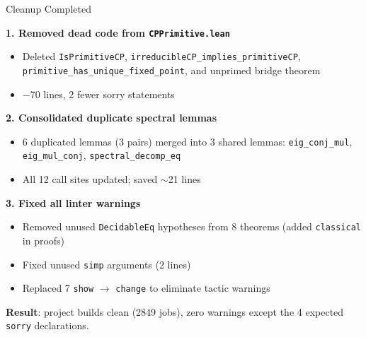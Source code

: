 \documentclass[aspectratio=169,10pt]{beamer}
\begin{document}
\begin{frame}{Cleanup Completed}
    \vspace{-0.3em}

    \textbf{1. Removed dead code from \texttt{CPPrimitive.lean}}~~\textcolor{leangreen}{\checkmark}
    \begin{itemize}\itemsep0.05em\small
        \item Deleted \texttt{IsPrimitiveCP}, \texttt{irreducibleCP\_implies\_primitiveCP},
            \texttt{primitive\_has\_unique\_fixed\_point}, and unprimed bridge theorem
        \item $-$70 lines, 2 fewer sorry statements
    \end{itemize}

    \vspace{0.3em}
    \textbf{2. Consolidated duplicate spectral lemmas}~~\textcolor{leangreen}{\checkmark}
    \begin{itemize}\itemsep0.05em\small
        \item 6 duplicated lemmas (3 pairs) merged into 3 shared lemmas:
            \texttt{eig\_conj\_mul}, \texttt{eig\_mul\_conj}, \texttt{spectral\_decomp\_eq}
        \item All 12 call sites updated; saved $\sim$21 lines
    \end{itemize}

    \vspace{0.3em}
    \textbf{3. Fixed all linter warnings}~~\textcolor{leangreen}{\checkmark}
    \begin{itemize}\itemsep0.05em\small
        \item Removed unused \texttt{DecidableEq} hypotheses from 8 theorems (added \texttt{classical} in proofs)
        \item Fixed unused \texttt{simp} arguments (2 lines)
        \item Replaced 7 \texttt{show} $\to$ \texttt{change} to eliminate tactic warnings
    \end{itemize}

    \vspace{0.2em}
    {\footnotesize \textbf{Result}: project builds clean (2849 jobs),
    zero warnings except the 4 expected \texttt{sorry} declarations.}
\end{frame}
\end{document}
